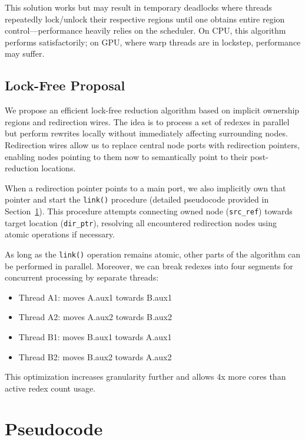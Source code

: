 \documentclass{article}
\begin{document}
This solution works but may result in temporary deadlocks where threads repeatedly lock/unlock their respective regions until one obtains entire region control—performance heavily relies on the scheduler. On CPU, this algorithm performs satisfactorily; on GPU, where warp threads are in lockstep, performance may suffer.

\subsection{Lock-Free Proposal}\label{ss:proposal}

We propose an efficient lock-free reduction algorithm based on implicit ownership regions and redirection wires. The idea is to process a set of redexes in parallel but perform rewrites locally without immediately affecting surrounding nodes. Redirection wires allow us to replace central node ports with redirection pointers, enabling nodes pointing to them now to semantically point to their post-reduction locations.

When a redirection pointer points to a main port, we also implicitly own that pointer and start the \texttt{link()} procedure (detailed pseudocode provided in Section~\ref{s:pseudocode}). This procedure attempts connecting owned node (\texttt{src\_ref}) towards target location (\texttt{dir\_ptr}), resolving all encountered redirection nodes using atomic operations if necessary.

As long as the \texttt{link()} operation remains atomic, other parts of the algorithm can be performed in parallel. Moreover, we can break redexes into four segments for concurrent processing by separate threads:

\begin{itemize}
    \item Thread A1: moves A.aux1 towards B.aux1
    \item Thread A2: moves A.aux2 towards B.aux2
    \item Thread B1: moves B.aux1 towards A.aux1
    \item Thread B2: moves B.aux2 towards A.aux2
\end{itemize}

This optimization increases granularity further and allows 4x more cores than active redex count usage.

\section{Pseudocode}\label{s:pseudocode}
\end{document}
